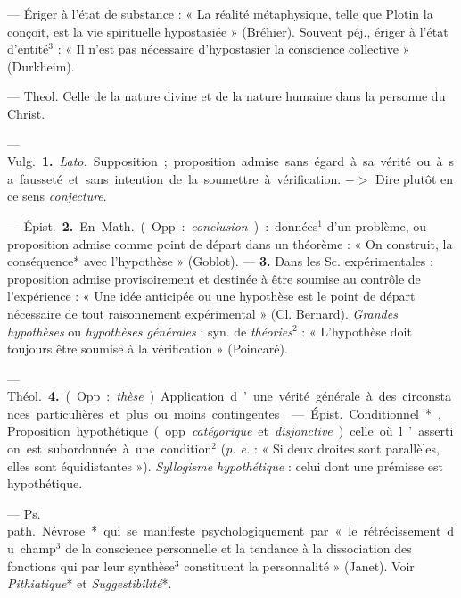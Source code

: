 \begin{itemize}[leftmargin=1cm, label=, itemsep=1pt]
 — Ériger à l'état de substance : « La réalité métaphysique,
telle que Plotin la conçoit, est la vie spirituelle hypostasiée » (Bréhier).
Souvent péj., ériger à l’état d’entité$^3$ : « Il n’est pas nécessaire
d’hypostasier la conscience collective » (Durkheim).

 — Theol. Celle de la nature divine et de la nature
humaine dans la personne du Christ.

 — \si{Vulg.} {\bf 1.} {\it Lato.} Supposition ; proposition
admise sans égard à sa vérité ou à sa fausseté et sans intention de la
soumettre à vérification. $->$ Dire plutôt en ce sens {\it conjecture}.

— \si{Épist.} {\bf 2.} En \si{Math.} (Opp. : {\it conclusion}) : données$^1$
d’un problème, ou proposition admise comme point de départ dans un théorème :
« On construit, la conséquence* avec l'hypothèse » (Goblot). — {\bf 3.} Dans
les Sc. expérimentales : proposition admise provisoirement et destinée à être
soumise au contrôle de l’expérience : « Une idée anticipée ou une hypothèse
est le point de départ nécessaire de tout raisonnement expérimental » (Cl.
Bernard). {\it Grandes hypothèses} ou {\it hypothèses générales} : syn. de
{\it théories}$^2$ : « L’hypothèse doit toujours être soumise à la
vérification » (Poincaré).

— \si{Théol.} {\bf 4.} (Opp. : {\it thèse}). Application d’une vérité
générale à des circonstances particulières et plus ou moins contingentes.

 — \si{Épist.} Conditionnel*, {\it }Proposition hypothétique
(opp. {\it catégorique} et {\it disjonctive}) celle où l’assertion est
subordonnée à une condition$^2$ ({\it p. e.} : « Si deux droites sont
parallèles, elles sont équidistantes »). {\it Syllogisme hypothétique} :
celui dont une prémisse est hypothétique.

 — \si{Ps. path.} Névrose* qui se manifeste psychologiquement
par « le rétrécissement du champ$^3$ de la conscience personnelle et la
tendance à la dissociation des fonctions qui par leur synthèse$^3$
constituent la personnalité » (Janet). Voir {\it Pithiatique}* et
{\it Suggestibilité}*.

	\end{itemize}
